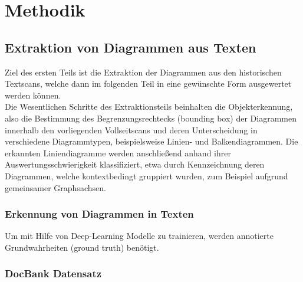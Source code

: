 \chapter{Methodik}
\label{ch:methodik}

\section{Extraktion von Diagrammen aus Texten}

Ziel des ersten Teils ist die Extraktion der Diagrammen aus den historischen Textscans, welche dann im folgenden Teil in eine gewünschte Form ausgewertet werden können.
\\
Die Wesentlichen Schritte des Extraktionsteils beinhalten die Objekterkennung, also die Bestimmung des Begrenzungsrechtecks (bounding box) der Diagrammen innerhalb den vorliegenden Vollseitscans und deren Unterscheidung in verschiedene Diagrammtypen, beispielsweise Linien- und Balkendiagrammen.
Die erkannten Liniendiagramme werden anschließend anhand ihrer Auswertungsschwierigkeit klassifiziert, etwa durch Kennzeichnung deren Diagrammen, welche kontextbedingt gruppiert wurden, zum Beispiel aufgrund gemeinsamer Graphsachsen.

\subsection{Erkennung von Diagrammen in Texten}
Um mit Hilfe von Deep-Learning Modelle zu trainieren, werden annotierte Grundwahrheiten (ground truth) benötigt.

\subsection*{DocBank Datensatz}

